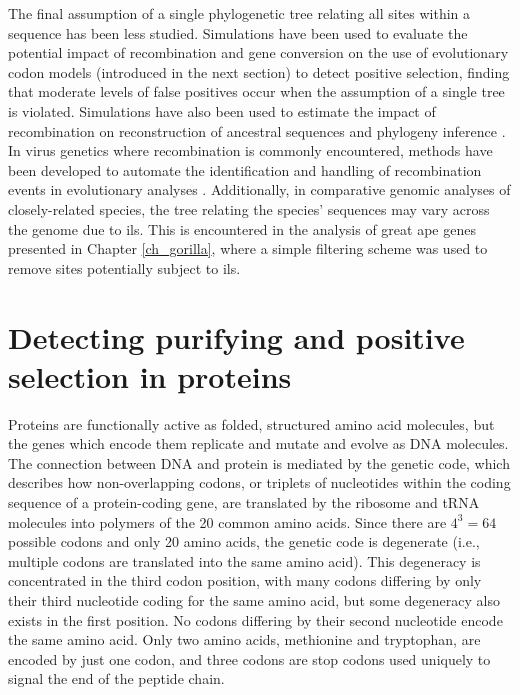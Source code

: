 The final assumption of a single phylogenetic tree relating all sites
within a sequence has been less studied. Simulations have been used to
evaluate the potential impact of recombination
\citep{Anisimova2003,Shriner2003} and gene conversion
\citep{Casola2009} on the use of evolutionary codon models (introduced
in the next section) to detect positive selection, finding that
moderate levels of false positives occur when the assumption of a
single tree is violated. Simulations have also been used to estimate
the impact of recombination on reconstruction of ancestral sequences
\citep{Busto2010} and phylogeny inference \citep{Schierup2000}. In
virus genetics where recombination is commonly encountered, methods
have been developed to automate the identification and handling of
recombination events in evolutionary analyses
\citep{Grassly1997,Pond2006}. Additionally, in comparative genomic
analyses of closely-related species, the tree relating the species'
sequences may vary across the genome due to \ac{ils}. This is
encountered in the analysis of great ape genes presented in Chapter
\ref{ch_gorilla}, where a simple filtering scheme was used to remove
sites potentially subject to \ac{ils}.

\section{Detecting purifying and positive selection in proteins}
\label{section_codon_models}

Proteins are functionally active as folded, structured amino acid
molecules, but the genes which encode them replicate and mutate and
evolve as DNA molecules. The connection between DNA and protein is
mediated by the genetic code, which describes how non-overlapping
codons, or triplets of nucleotides within the coding sequence of a
protein-coding gene, are translated by the ribosome and tRNA molecules
into polymers of the 20 common amino acids. Since there are $4^3=64$
possible codons and only 20 amino acids, the genetic code is
degenerate (i.e., multiple codons are translated into the same amino
acid). This degeneracy is concentrated in the third codon position,
with many codons differing by only their third nucleotide coding for
the same amino acid, but some degeneracy also exists in the first
position. No codons differing by their second nucleotide encode the
same amino acid. Only two amino acids, methionine and tryptophan, are
encoded by just one codon, and three codons are stop codons used
uniquely to signal the end of the peptide chain.

